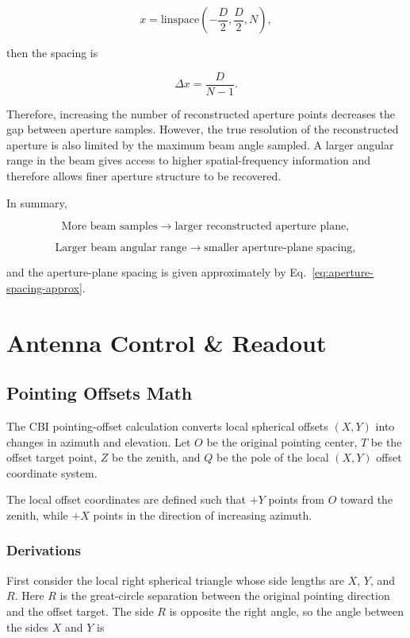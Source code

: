 \documentclass[12pt]{extarticle}
\begin{document}
\begin{equation}
x = \mathrm{linspace}\left(-\frac{D}{2}, \frac{D}{2}, N\right),
\end{equation}

then the spacing is

\begin{equation}
\Delta x = \frac{D}{N-1}.
\end{equation}

Therefore, increasing the number of reconstructed aperture points decreases the gap between aperture samples. However, the true resolution of the reconstructed aperture is also limited by the maximum beam angle sampled. A larger angular range in the beam gives access to higher spatial-frequency information and therefore allows finer aperture structure to be recovered.

In summary,

\begin{equation}
\text{More beam samples}
\rightarrow
\text{larger reconstructed aperture plane},
\end{equation}

\begin{equation}
\text{Larger beam angular range}
\rightarrow
\text{smaller aperture-plane spacing},
\end{equation}

and the aperture-plane spacing is given approximately by Eq.~\eqref{eq:aperture-spacing-approx}.

\section{Antenna Control \& Readout}

\subsection{Pointing Offsets Math}

The CBI pointing-offset calculation converts local spherical offsets $(X,Y)$ into changes in azimuth and elevation. Let $O$ be the original pointing center, $T$ be the offset target point, $Z$ be the zenith, and $Q$ be the pole of the local $(X,Y)$ offset coordinate system.

The local offset coordinates are defined such that $+Y$ points from $O$ toward the zenith, while $+X$ points in the direction of increasing azimuth.

\subsubsection{Derivations}
First consider the local right spherical triangle whose side lengths are $X$, $Y$, and $R$. Here $R$ is the great-circle separation between the original pointing direction and the offset target. The side $R$ is opposite the right angle, so the angle between the sides $X$ and $Y$ is
\end{document}
